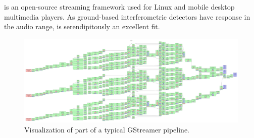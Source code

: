 \documentclass[portrait,plainboxedsections]{sciposter}
\begin{document}
\begin{minipage}[t]{0.25\textwidth}
\vspace{-1.5em}
\gstreamer{} is an open-source streaming framework used for
Linux and mobile desktop multimedia players. As ground-based interferometric
detectors have response in the audio range, \gstreamer{} is serendipitously
an excellent fit.
%
\begin{figure}
\includegraphics[width=\textwidth]{figures/network}
\caption{\label{fig:gstreamer}Visualization of part of a typical GStreamer pipeline.}
\end{figure}
\vspace{-2em}

\end{minipage}
\end{document}

